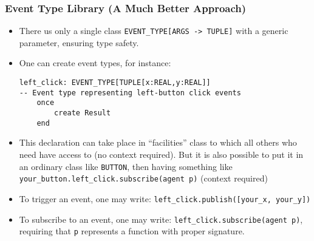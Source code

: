 \documentclass[a4paper]{article}
\newcommand{\inline}[1]{\lstinline!#1!}%
\begin{document}
\subsubsection{Event Type Library (A Much Better Approach)}
\begin{itemize}
\item There us only a single class \inline{EVENT_TYPE[ARGS -> TUPLE]} with a generic parameter, ensuring type safety. 
\item One can create event types, for instance:
\begin{lstlisting}
left_click: EVENT_TYPE[TUPLE[x:REAL,y:REAL]]
-- Event type representing left-button click events
	once
		create Result
	end
\end{lstlisting}
\item This declaration can take place in ``facilities'' class to which all others who need have access to (no context required). But it is also possible to put it in an ordinary class like \inline{BUTTON}, then having something like \inline{your_button.left_click.subscribe(agent p)} (context required)
\item To trigger an event, one may write: \inline{left_click.publish([your_x, your_y])}
\item To subscribe to an event, one may write: \inline{left_click.subscribe(agent p)}, requiring that \inline{p} represents a function with proper signature.
\end{itemize}
\end{document}
